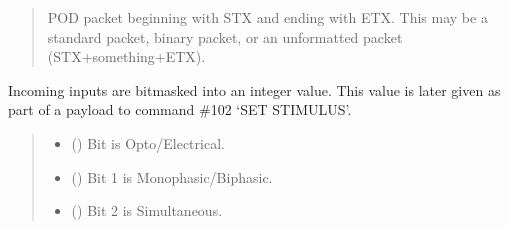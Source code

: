 \documentclass[letterpaper,10pt,english]{sphinxmanual}
\begin{document}
\begin{fulllineitems}
\begin{fulllineitems}
\begin{quote}
\begin{description}
\begin{itemize}
\end{itemize}

\sphinxAtStartPar
POD packet beginning with STX and ending with ETX. This may be a                 standard packet, binary packet, or an unformatted packet (STX+something+ETX).

\sphinxAtStartPar
{\hyperref[\detokenize{PodApi.Packets:PodApi.Packets.Packet.Packet}]{}}

\end{description}\end{quote}

\end{fulllineitems}


\begin{fulllineitems}
\label{\detokenize{PodApi.Devices:PodApi.Devices.PodDevice_8480SC.Pod8480SC.StimulusConfigBits}}
\pysigstartsignatures
{}
\pysigstopsignatures
\sphinxAtStartPar
Incoming inputs are bitmasked into an integer value. This value is later given as part of a payload         to command \#102 ‘SET STIMULUS’.
\begin{quote}\begin{description}
\begin{itemize}
\item {} 
\sphinxAtStartPar
{} () \textendash{} Bit  is Opto/Electrical.

\item {} 
\sphinxAtStartPar
{} () \textendash{} Bit 1 is Monophasic/Biphasic.

\item {} 
\sphinxAtStartPar
{} () \textendash{} Bit 2 is Simultaneous.


\end{itemize}
\end{description}
\end{quote}
\end{fulllineitems}
\end{fulllineitems}
\end{document}

